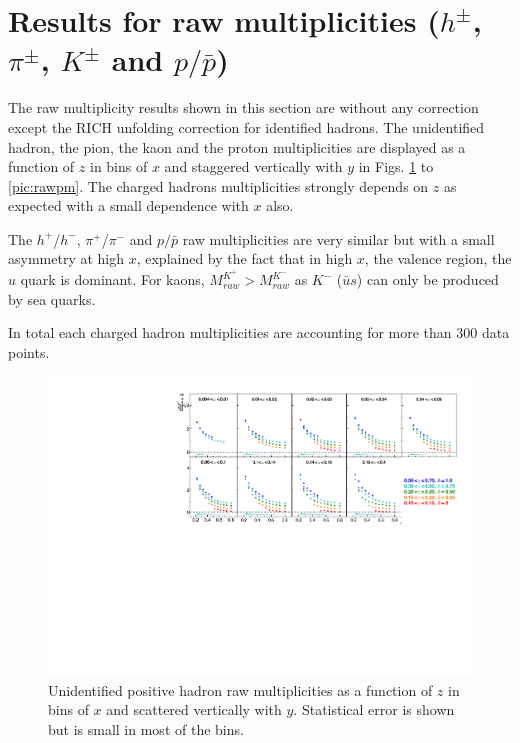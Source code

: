 \section{Results for raw multiplicities ($h^{\pm}$, $\pi^{\pm}$, $K^{\pm}$ and $p/\bar{p}$)}

The raw multiplicity results shown in this section are without any correction except the RICH unfolding correction for identified hadrons. The unidentified hadron, the pion, the kaon and the proton multiplicities are displayed as a function of $z$ in bins of $x$ and staggered vertically with $y$ in Figs. \ref{pic:rawhp} to \ref{pic:rawpm}. The charged hadrons multiplicities strongly depends on $z$ as expected with a small dependence with $x$ also.

The $h^+$/$h^-$, $\pi^+$/$\pi^-$ and $p/\bar{p}$ raw multiplicities are very similar but with a small asymmetry at high $x$, explained by the fact that in high $x$, the valence region, the $u$ quark is dominant. For kaons, $M_{raw}^{K^+} > M_{raw}^{K^-}$ as $K^-$ ($\bar{u}s$) can only be produced by sea quarks.

In total each charged hadron multiplicities are accounting for more than 300 data points.

\begin{figure}[!h]
	\includegraphics[scale=0.85]{./gfx/rawhp.pdf}
	\caption{Unidentified positive hadron raw multiplicities as a function of $z$ in bins of $x$ and scattered vertically with $y$. Statistical error is shown but is small in most of the bins.}
	\label{pic:rawhp}
\end{figure}

